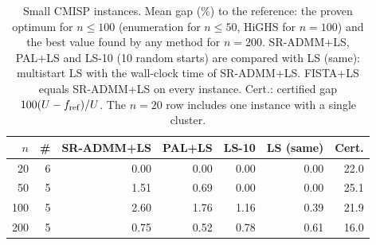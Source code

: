 \begin{table}[H]
\centering\small
\caption{Small CMISP instances. Mean gap (\%) to the reference: the proven optimum for $n\le100$ (enumeration for $n\le50$, HiGHS for $n=100$) and the best value found by any method for $n=200$. SR-ADMM+LS, PAL+LS and LS-10 (10 random starts) are compared with LS (same): multistart LS with the wall-clock time of SR-ADMM+LS. FISTA+LS equals SR-ADMM+LS on every instance. Cert.: certified gap $100(U-f_{\rm ref})/U$. The $n=20$ row includes one instance with a single cluster.}
\label{tab:cmispsmall}
\begin{tabular}{rrrrrrr}
\toprule
$n$ & \# & SR-ADMM+LS & PAL+LS & LS-10 & LS (same) & Cert.\\
\midrule
20 & 6 & 0.00 & 0.00 & 0.00 & 0.00 & 22.0\\
50 & 5 & 1.51 & 0.69 & 0.00 & 0.00 & 25.1\\
100 & 5 & 2.60 & 1.76 & 1.16 & 0.39 & 21.9\\
200 & 5 & 0.75 & 0.52 & 0.78 & 0.61 & 16.0\\
\bottomrule
\end{tabular}
\end{table}

